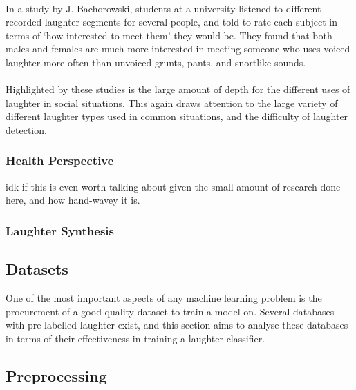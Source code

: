 \documentclass[a4paper,11pt,notitlepage]{article}
\begin{document}
\\
In a study by J. Bachorowski, students at a university listened to different recorded laughter segments for several people, and told to rate each subject in terms of `how interested to meet them' they would be. They found that both males and females are much more interested in meeting someone who uses voiced laughter more often than unvoiced grunts, pants, and snortlike sounds.\cite{bachorowski2001not}\\
\\
Highlighted by these studies is the large amount of depth for the different uses of laughter in social situations. This again draws attention to the large variety of different laughter types used in common situations, and the difficulty of laughter detection.

\subsubsection{Health Perspective}
idk if this is even worth talking about given the small amount of research done here, and how hand-wavey it is.

\subsubsection{Laughter Synthesis}
\cite{dupont2014acoustic}

\subsection{Datasets}

One of the most important aspects of any machine learning problem is the procurement of a good quality dataset to train a model on. Several databases with pre-labelled laughter exist, and this section aims to analyse these databases in terms of their effectiveness in training a laughter classifier. 
\cite{dupont2014acoustic}

\subsection{Preprocessing}

\end{document}
